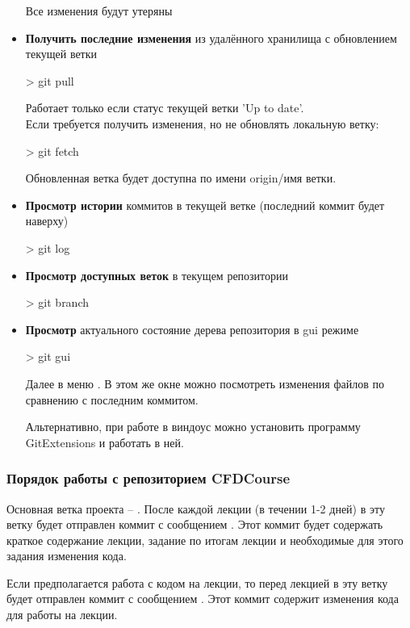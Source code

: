 \begin{itemize}
  Все изменения будут утеряны
\item
  {\bf Получить последние изменения} из удалённого хранилища с обновлением текущей ветки
  \begin{shelloutput}
> git pull
  \end{shelloutput}
  Работает только если статус текущей ветки 'Up to date'.\\
  Если требуется получить изменения, но не обновлять локальную ветку:
  \begin{shelloutput}
> git fetch
  \end{shelloutput}
  Обновленная ветка будет доступна по имени origin/{имя ветки}.
\item
  {\bf Просмотр истории} коммитов в текущей ветке (последний коммит будет наверху)
  \begin{shelloutput}
> git log
  \end{shelloutput}
\item
  {\bf Просмотр доступных веток} в текущем репозитории
  \begin{shelloutput}
> git branch
  \end{shelloutput}
\item
  {\bf Просмотр} актуального состояние дерева репозитория в gui режиме
  \begin{shelloutput}
> git gui
  \end{shelloutput}
  Далее в меню .
  В этом же окне можно посмотреть изменения файлов по сравнению с последним коммитом.

  Альтернативно, при работе в виндоус можно установить программу GitExtensions и работать в ней.
\end{itemize}
  
\subsubsection{Порядок работы с репозиторием CFDCourse}

Основная ветка проекта -- . После каждой лекции (в течении 1-2 дней) в эту ветку будет отправлен коммит с сообщением .
Этот коммит будет содержать краткое содержание лекции,
задание по итогам лекции и необходимые для этого задания изменения кода.

Если предполагается работа с кодом на лекции, то перед лекцией в эту ветку будет отправлен коммит с сообщением .
Этот коммит содержит изменения кода для работы на лекции.

